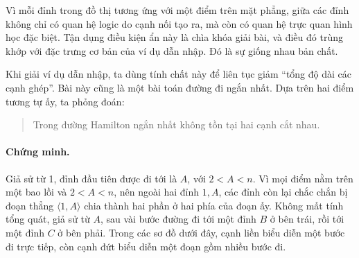 \documentclass[11pt]{article}
\begin{document}
Vì mỗi đỉnh trong đồ thị tương ứng với một điểm trên mặt phẳng, giữa các đỉnh
không chỉ có quan hệ logic do cạnh nối tạo ra, mà còn có quan hệ trực quan
hình học đặc biệt. Tận dụng điều kiện ẩn này là chìa khóa giải bài, và điều
đó trùng khớp với đặc trưng cơ bản của ví dụ dẫn nhập. Đó là sự giống nhau
bản chất.

Khi giải ví dụ dẫn nhập, ta dùng tính chất này để liên tục giảm ``tổng độ dài
các cạnh ghép''. Bài này cũng là một bài toán đường đi ngắn nhất. Dựa trên
hai điểm tương tự ấy, ta phỏng đoán:

\begin{quote}
 Trong đường Hamilton ngắn nhất không tồn tại hai cạnh
cắt nhau.
\end{quote}

\paragraph{Chứng minh.}
Giả sử từ 1, đỉnh đầu tiên được đi tới là \(A\), với \(2<A<n\). Vì mọi điểm
nằm trên một bao lồi và \(2<A<n\), nên ngoài hai đỉnh \(1,A\), các đỉnh còn
lại chắc chắn bị đoạn thẳng \(\langle 1,A\rangle\) chia thành hai phần ở hai
phía của đoạn ấy. Không mất tính tổng quát, giả sử từ \(A\), sau vài bước
đường đi tới một đỉnh \(B\) ở bên trái, rồi tới một đỉnh \(C\) ở bên phải.
Trong các sơ đồ dưới đây, cạnh liền biểu diễn một bước đi trực tiếp, còn cạnh
đứt biểu diễn một đoạn gồm nhiều bước đi.

\begin{center}
\end{center}
\end{document}
